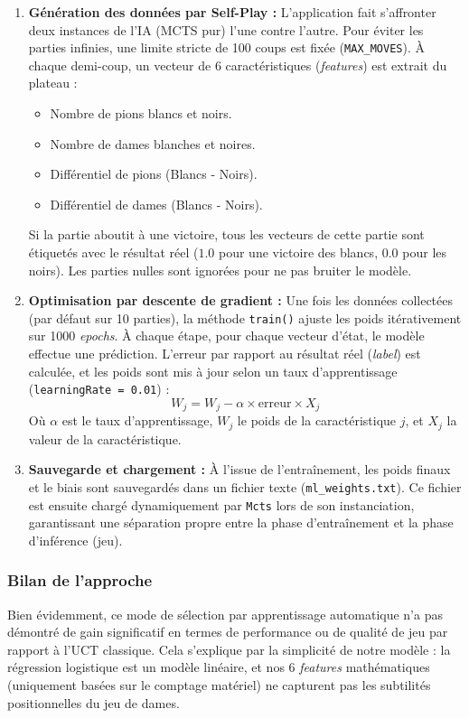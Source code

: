 \documentclass[a4paper]{article}
\begin{document}
\begin{enumerate}
    \item \textbf{Génération des données par Self-Play :} L'application fait s'affronter deux instances de l'IA (MCTS pur) l'une 
    contre l'autre. Pour éviter les parties infinies, une limite stricte de 100 coups est fixée (\texttt{MAX\_MOVES}). À chaque demi-coup,
     un vecteur de 6 caractéristiques (\textit{features}) est extrait du plateau :
    \begin{itemize}
        \item Nombre de pions blancs et noirs.
        \item Nombre de dames blanches et noires.
        \item Différentiel de pions (Blancs - Noirs).
        \item Différentiel de dames (Blancs - Noirs).
    \end{itemize}
    Si la partie aboutit à une victoire, tous les vecteurs de cette partie sont étiquetés avec le résultat réel 
    ($1.0$ pour une victoire des blancs, $0.0$ pour les noirs). Les parties nulles sont ignorées pour ne pas bruiter le modèle.

    \item \textbf{Optimisation par descente de gradient :} Une fois les données collectées (par défaut sur 10 parties), 
    la méthode \texttt{train()} ajuste les poids itérativement sur 1000 \textit{epochs}. À chaque étape, pour chaque vecteur d'état,
     le modèle effectue une prédiction. L'erreur par rapport au résultat réel (\textit{label}) est calculée, et les poids sont mis à 
     jour selon un taux d'apprentissage (\texttt{learningRate = 0.01}) :
    $$W_{j} = W_{j} - \alpha \times \text{erreur} \times X_{j}$$
    Où $\alpha$ est le taux d'apprentissage, $W_j$ le poids de la caractéristique $j$, et $X_j$ la valeur de la caractéristique.

    \item \textbf{Sauvegarde et chargement :} À l'issue de l'entraînement, les poids finaux et le biais sont sauvegardés dans un 
    fichier texte (\texttt{ml\_weights.txt}). Ce fichier est ensuite chargé dynamiquement par \texttt{Mcts} lors de son 
    instanciation, garantissant une séparation propre entre la phase d'entraînement et la phase d'inférence (jeu).
\end{enumerate}

\subsubsection{Bilan de l'approche}
Bien évidemment, ce mode de sélection par apprentissage automatique n'a pas démontré de gain significatif en termes de 
performance ou de qualité de jeu par rapport à l'UCT classique. Cela s'explique par la simplicité de notre modèle : 
la régression logistique est un modèle linéaire, et nos 6 \textit{features} mathématiques (uniquement basées sur le comptage matériel)
 ne capturent pas les subtilités positionnelles du jeu de dames. 
\end{document}
